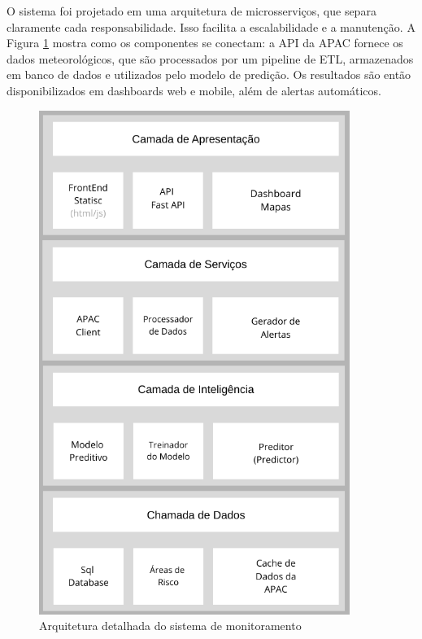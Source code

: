 O sistema foi projetado em uma arquitetura de microsserviços, que separa claramente cada responsabilidade. Isso facilita a escalabilidade e a manutenção. A Figura \ref{fig:arquitetura-detailed} mostra como os componentes se conectam: a API da APAC fornece os dados meteorológicos, que são processados por um pipeline de ETL, armazenados em banco de dados e utilizados pelo modelo de predição. Os resultados são então disponibilizados em dashboards web e mobile, além de alertas automáticos.

\begin{figure}[H] %
    \centering
    \includegraphics[width=0.9\textwidth]{figuras/estrutura-projeto.png}
    \caption{Arquitetura detalhada do sistema de monitoramento}
    \label{fig:arquitetura-detailed}
\end{figure}


